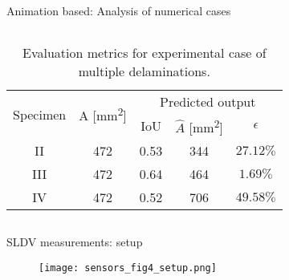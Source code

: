 \documentclass[10pt,aspectratio=169,dvipsnames]{beamer} %
\begin{document}
\begin{frame}{Animation based: Analysis of numerical cases}
\begin{columns}[T]
\begin{column}[t]{.5\textwidth}
\begin{table}[!h]
					\centering
					\caption{Evaluation metrics for experimental case of multiple delaminations.}
					\begin{tabular}{ccccc}
						\toprule[1.5pt]
						\multirow{2}{*}{Specimen} & \multicolumn{1}{c}{\multirow{2}{*}{A [mm\textsuperscript{2}]}} & \multicolumn{3}{c}{Predicted output} \\ 
						\cmidrule(lr){3-5} & & \multicolumn{1}{c}{IoU} & \multicolumn{1}{c}{\(\hat{A}\) [mm\textsuperscript{2}]} & \(\epsilon\) \\
						\midrule
						II & 472 & \multicolumn{1}{c}{0.53} &  \multicolumn{1}{c}{344} & \(27.12\%\) \\ 
						III & 472 & \multicolumn{1}{c}{0.64} & \multicolumn{1}{c}{464} & \(1.69\%\) \\ 
						IV & 472 & \multicolumn{1}{c}{0.52} & \multicolumn{1}{c}{706} & \(49.58\%\) \\			 					 
						\bottomrule[1.5pt]										
					\end{tabular}
				\end{table}				
			\end{column}
		\end{columns}						
	\end{frame}
	\begin{frame}{SLDV measurements: setup}
		\begin{figure}
			\texttt{[image: sensors\_fig4\_setup.png]}
		\end{figure}
	\end{frame}
	\setcounter{subfigure}{0}
\end{document}
